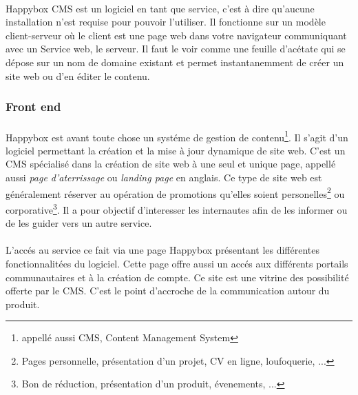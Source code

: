 \documentclass[11pt, a4paper ]{article}
\begin{document}
\paragraph{}
Happybox CMS est un logiciel en tant que service, c'est à dire qu'aucune installation n'est requise pour pouvoir l'utiliser. Il fonctionne sur un modèle client-serveur où le client est une page web dans votre navigateur communiquant avec un Service web, le serveur. Il faut le voir comme une feuille d'acétate qui se dépose sur un nom de domaine existant et permet instantanemment de créer un site web ou d'en éditer le contenu.

\subsubsection{Front end}
	\paragraph{}
Happybox est avant toute chose un systéme de gestion de contenu\footnote{appellé aussi CMS, Content Management System}. Il s'agit d'un logiciel permettant la création et la mise à jour dynamique de site web.
C'est un CMS spécialisé dans la création de site web à une seul et unique page, appellé aussi \emph{page d'aterrissage} ou \emph{landing page} en anglais. Ce type de site web est généralement réserver au opération de promotions qu'elles soient personelles\footnote{Pages personnelle, présentation d'un projet, CV en ligne, loufoquerie, ...} ou corporative\footnote{Bon de réduction, présentation d'un produit, évenements, ...}. Il a pour objectif d'interesser les internautes afin de les informer ou de les guider vers un autre service.



\paragraph{}
L'accés au service ce fait via une page Happybox présentant les différentes fonctionnalitées du logiciel. Cette page offre aussi un accés aux différents portails communautaires et à la création de compte. Ce site est une vitrine des possibilité offerte par le CMS. C'est le point d'accroche de la communication autour du produit.
\end{document}
